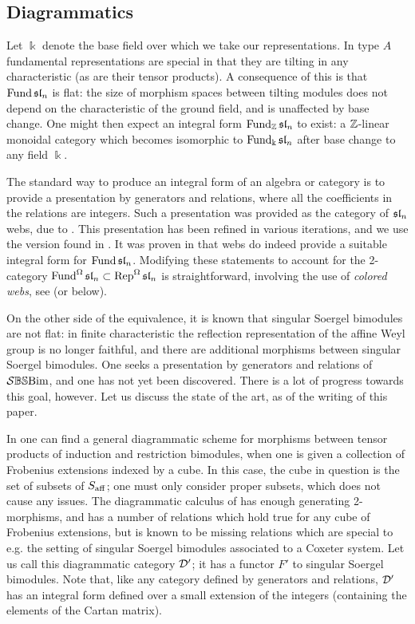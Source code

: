 {\subsection{Diagrammatics}


Let $\Bbbk$ denote the base field over which we take our representations. In type $A$ fundamental representations are special in that they are tilting in any characteristic (as are their tensor products). A consequence of this is that $\operatorname{Fund} \mathfrak{sl}_n$ is flat: the size of morphism spaces between tilting modules does not depend on the characteristic of the ground field, and is unaffected by base change. One might then expect an integral form $\operatorname{Fund}_{\mathbb{Z}} \mathfrak{sl}_n$ to exist: a $\mathbb{Z}$-linear monoidal category which becomes isomorphic to $\operatorname{Fund}_{\Bbbk} \mathfrak{sl}_n$ after base change to any field $\Bbbk$.

The standard way to produce an integral form of an algebra or category is to provide a presentation by generators and relations, where all the coefficients in the relations are integers. Such a presentation was provided as the category of $\mathfrak{sl}_n$ webs, due to \cite{Kupe, CKM}. This presentation has been refined in various iterations, and we use the version found in \cite{Bigelow}  . It was proven in \cite{ELLCC} that webs do indeed provide a suitable integral form for $\operatorname{Fund} \mathfrak{sl}_n$. Modifying these statements to account for the 2-category $\operatorname{Fund}^{\Omega} \mathfrak{sl}_n \subset \operatorname{Rep}^{\Omega} \mathfrak{sl}_n$ is straightforward, involving the use of \emph{colored webs}, see \cite{EQuantumI} (or below).

On the other side of the equivalence, it is known that singular Soergel bimodules are not flat: in finite characteristic the reflection representation of the affine Weyl group is no longer faithful, and there are additional morphisms between singular Soergel bimodules. One seeks a presentation by generators and relations of $\mathcal{S}\mathbb{BS}\text{Bim}$, and one has not yet been discovered. There is a lot of progress towards this goal, however. Let us discuss the state of the art, as of the writing of this paper.

In \cite{EWSFrob} one can find a general diagrammatic scheme for morphisms between tensor products of induction and restriction bimodules, when one is given a collection of Frobenius extensions indexed by a cube. In this case, the cube in question is the set of subsets of $S_{\operatorname{aff}}$; one must only consider proper subsets, which does not cause any issues. The diagrammatic calculus of \cite{EWSFrob} has enough generating 2-morphisms, and has a number of relations which hold true for any cube of Frobenius extensions, but is known to be missing relations which are special to e.g. the setting of singular Soergel bimodules associated to a Coxeter system. Let us call this diagrammatic category $\mathcal{D}'$; it has a functor $F'$ to singular Soergel bimodules. Note that, like any category defined by generators and relations, $\mathcal{D}'$ has an integral form defined over a small extension of the integers (containing the elements of the Cartan matrix).

}
